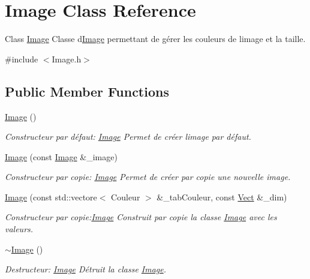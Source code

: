 \hypertarget{classImage}{}\section{Image Class Reference}
\label{classImage}


Class \hyperlink{classImage}{Image} Classe d\textquotesingle{}\hyperlink{classImage}{Image} permettant de gérer les couleurs de l\textquotesingle{}image et la taille.  




{\ttfamily \#include $<$Image.\+h$>$}

\subsection*{Public Member Functions}
\begin{DoxyCompactItemize}
\item 
\hyperlink{classImage_a58edd1c45b4faeb5f789b0d036d02313}{Image} ()
\begin{DoxyCompactList}\small\item\em Constructeur par défaut\+: \hyperlink{classImage}{Image} Permet de créer l\textquotesingle{}image par défaut. \end{DoxyCompactList}\item 
\hyperlink{classImage_a18dba28d7d81f51cabf37e0044bd2d6c}{Image} (const \hyperlink{classImage}{Image} \&\+\_\+image)
\begin{DoxyCompactList}\small\item\em Constructeur par copie\+: \hyperlink{classImage}{Image} Permet de créer par copie une nouvelle image. \end{DoxyCompactList}\item 
\hyperlink{classImage_ae8b4bc2d9cf6b0591f9c16829e0b1dad}{Image} (const std\+::vectore$<$ Couleur $>$ \&\+\_\+tab\+Couleur, const \hyperlink{classVect}{Vect} \&\+\_\+dim)
\begin{DoxyCompactList}\small\item\em Constructeur par copie\+:\hyperlink{classImage}{Image} Construit par copie la classe \hyperlink{classImage}{Image} avec les valeurs. \end{DoxyCompactList}\item 
\mbox{\label{classImage_a0294f63700543e11c0f0da85601c7ae5}} 
\hyperlink{classImage_a0294f63700543e11c0f0da85601c7ae5}{$\sim$\+Image} ()
\begin{DoxyCompactList}\small\item\em Destructeur\+: \hyperlink{classImage}{Image} Détruit la classe \hyperlink{classImage}{Image}. \end{DoxyCompactList}\item 

\end{DoxyCompactItemize}

